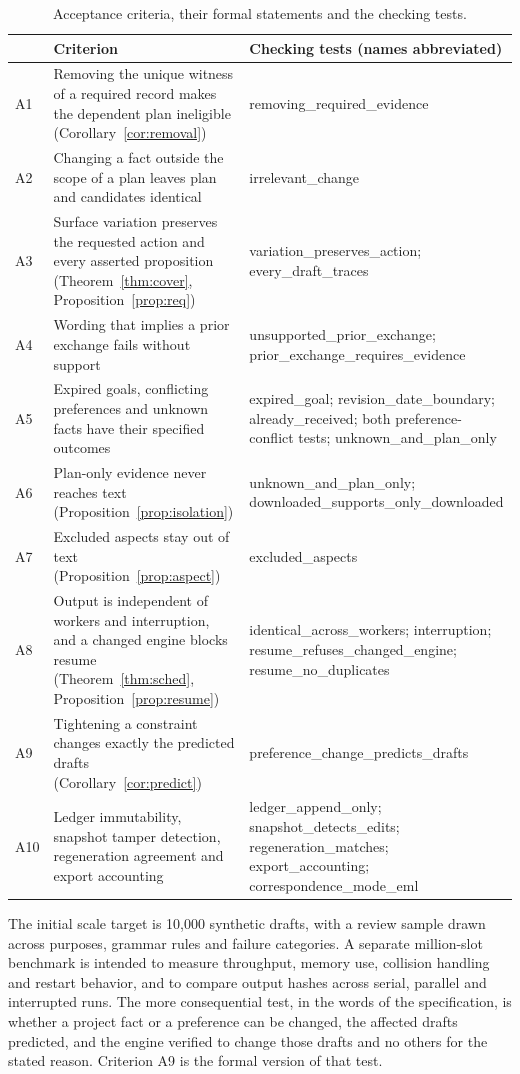 \documentclass[11pt]{article}
\theoremstyle{definition}
\theoremstyle{remark}
\begin{document}
\begin{table}[H]
\centering
\caption{Acceptance criteria, their formal statements and the checking tests.}\label{tab:accept}
\small\raggedright
\begin{tabular}{p{0.5cm}p{5.2cm}p{6.2cm}}
\toprule
 & Criterion & Checking tests (names abbreviated)\\
\midrule
A1 & Removing the unique witness of a required record makes the dependent plan ineligible (Corollary~\ref{cor:removal}) & removing\_required\_evidence\\
A2 & Changing a fact outside the scope of a plan leaves plan and candidates identical & irrelevant\_change\\
A3 & Surface variation preserves the requested action and every asserted proposition (Theorem~\ref{thm:cover}, Proposition~\ref{prop:req}) & variation\_preserves\_action; every\_draft\_traces\\
A4 & Wording that implies a prior exchange fails without support & unsupported\_prior\_exchange; prior\_exchange\_requires\_evidence\\
A5 & Expired goals, conflicting preferences and unknown facts have their specified outcomes & expired\_goal; revision\_date\_boundary; already\_received; both preference-conflict tests; unknown\_and\_plan\_only\\
A6 & Plan-only evidence never reaches text (Proposition~\ref{prop:isolation}) & unknown\_and\_plan\_only; downloaded\_supports\_only\_downloaded\\
A7 & Excluded aspects stay out of text (Proposition~\ref{prop:aspect}) & excluded\_aspects\\
A8 & Output is independent of workers and interruption, and a changed engine blocks resume (Theorem~\ref{thm:sched}, Proposition~\ref{prop:resume}) & identical\_across\_workers; interruption; resume\_refuses\_changed\_engine; resume\_no\_duplicates\\
A9 & Tightening a constraint changes exactly the predicted drafts (Corollary~\ref{cor:predict}) & preference\_change\_predicts\_drafts\\
A10 & Ledger immutability, snapshot tamper detection, regeneration agreement and export accounting & ledger\_append\_only; snapshot\_detects\_edits; regeneration\_matches; export\_accounting; correspondence\_mode\_eml\\
\bottomrule
\end{tabular}
\end{table}

The initial scale target is 10,000 synthetic drafts, with a review sample drawn across purposes, grammar rules and failure categories. A separate million-slot benchmark is intended to measure throughput, memory use, collision handling and restart behavior, and to compare output hashes across serial, parallel and interrupted runs. The more consequential test, in the words of the specification, is whether a project fact or a preference can be changed, the affected drafts predicted, and the engine verified to change those drafts and no others for the stated reason. Criterion A9 is the formal version of that test.
\end{document}
